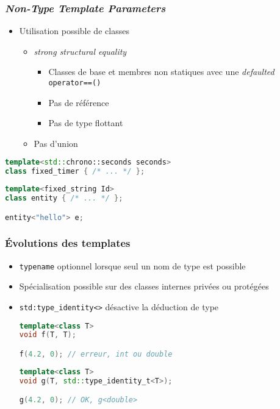 \documentclass[C++.tex]{subfiles}
\begin{document}
\begin{frame}[fragile]
	\frametitle{\textit{Non-Type Template Parameters}}
	\begin{itemize}
		\item Utilisation possible de classes
		\begin{itemize}
			\item \textit{strong structural equality}
			\begin{itemize}
				\item Classes de base et membres non statiques avec une \textit{defaulted} \lstinline|operator==()|
				\item Pas de référence
				\item Pas de type flottant
			\end{itemize}
			\item Pas d'union
		\end{itemize}
	\end{itemize}

	\begin{lstlisting}[language=C++]
template<std::chrono::seconds seconds>
class fixed_timer { /* ... */ };\end{lstlisting}


	\begin{lstlisting}[language=C++]
template<fixed_string Id>
class entity { /* ... */ };

entity<"hello"> e;\end{lstlisting}

\end{frame}

\begin{frame}[fragile]
	\frametitle{Évolutions des templates}
	\begin{itemize}
		\item \lstinline|typename| optionnel lorsque seul un nom de type est possible
		

		\item Spécialisation possible sur des classes internes privées ou protégées
		\item \lstinline|std:type_identity<>| désactive la déduction de type

		\begin{lstlisting}[language=C++]
template<class T>
void f(T, T);

f(4.2, 0); // erreur, int ou double\end{lstlisting}

		\begin{lstlisting}[language=C++]
template<class T>
void g(T, std::type_identity_t<T>);

g(4.2, 0); // OK, g<double>\end{lstlisting}
	\end{itemize}
\end{frame}
\end{document}
